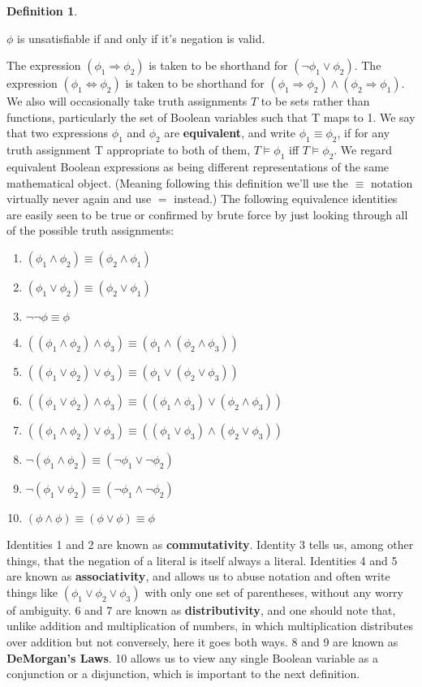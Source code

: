 \documentclass{article}
\theoremstyle{definition}
\newtheorem{definition}{Definition}[section]
\theoremstyle{plain}
\theoremstyle{theorem}
\begin{document}
\begin{definition}
\begin{center}
    $\phi$ is unsatisfiable if and only if it's negation is valid.
\end{center}
\par The expression $(\phi_1 \Rightarrow \phi_2)$ is taken to be shorthand for $(\neg \phi_1 \vee \phi_2)$. The expression $(\phi_1 \iff \phi_2)$ is taken to be shorthand for $(\phi_1 \Rightarrow \phi_2) \wedge (\phi_2 \Rightarrow \phi_1)$. We also will occasionally take truth assignments $T$ to be sets rather than functions, particularly the set of Boolean variables such that T maps to 1. We say that two expressions $\phi_1$ and $\phi_2$ are \textbf{equivalent}, and write $\phi_1 \equiv \phi_2$, if for any truth assignment T appropriate to both of them, $T \models \phi_1$ iff $T \models \phi_2$. We regard equivalent Boolean expressions as being different representations of the same mathematical object. (Meaning following this definition we'll use the $\equiv$ notation virtually never again and use $=$ instead.) The following equivalence identities are easily seen to be true or confirmed by brute force by just looking through all of the possible truth assignments:
\begin{enumerate}
    \item $(\phi_1 \wedge \phi_2) \equiv (\phi_2 \wedge \phi_1)$
    \item $(\phi_1 \vee \phi_2) \equiv (\phi_2 \vee \phi_1)$
    \item $\neg \neg \phi \equiv \phi$
    \item $((\phi_1 \wedge \phi_2) \wedge \phi_3) \equiv (\phi_1 \wedge (\phi_2 \wedge \phi_3))$
    \item $((\phi_1 \vee \phi_2) \vee \phi_3) \equiv (\phi_1 \vee (\phi_2 \vee \phi_3))$
    \item $((\phi_1 \vee \phi_2) \wedge \phi_3) \equiv ((\phi_1 \wedge \phi_3) \vee (\phi_2 \wedge \phi_3))$
    \item $((\phi_1 \wedge \phi_2) \vee \phi_3) \equiv ((\phi_1 \vee \phi_3) \wedge (\phi_2 \vee \phi_3))$
    \item $\neg(\phi_1 \wedge \phi_2) \equiv (\neg \phi_1 \vee \neg \phi_2)$
    \item $\neg(\phi_1 \vee \phi_2) \equiv (\neg \phi_1 \wedge \neg \phi_2)$
    \item $(\phi \wedge \phi) \equiv (\phi \vee \phi) \equiv \phi$
\end{enumerate}
Identities 1 and 2 are known as \textbf{commutativity}. Identity 3 tells us, among other things, that the negation of a literal is itself always a literal. Identities 4 and 5 are known as \textbf{associativity}, and allows us to abuse notation and often write things like $(\phi_1 \vee \phi_2 \vee \phi_3)$ with only one set of parentheses, without any worry of ambiguity. 6 and 7 are known as \textbf{distributivity}, and one should note that, unlike addition and multiplication of numbers, in which multiplication distributes over addition but not conversely, here it goes both ways. 8 and 9 are known as \textbf{DeMorgan's Laws}. 10 allows us to view any single Boolean variable as a conjunction or a disjunction, which is important to the next definition. 

\end{definition}
\end{document}
